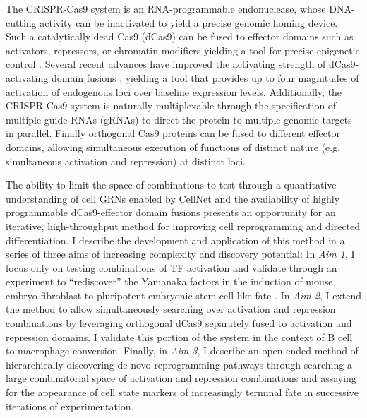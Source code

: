 \documentclass[10pt]{article}
\begin{document}
The CRISPR-Cas9 system is an RNA-programmable endonuclease, whose DNA-cutting activity can be inactivated to yield a precise genomic homing device. Such a catalytically dead Cas9 (dCas9) can be fused to effector domains such as activators, repressors, or chromatin modifiers yielding a tool for precise epigenetic control \cite{qi2013repurposing}. Several recent advances have improved the activating strength of dCas9-activating domain fusions \cite{konermann2014genome, chavez2015VPR}, yielding a tool that provides up to four magnitudes of activation of endogenous loci over baseline expression levels. Additionally, the CRISPR-Cas9 system is naturally multiplexable through the specification of multiple guide RNAs (gRNAs) to direct the protein to multiple genomic targets in parallel. Finally orthogonal Cas9 proteins \cite{esvelt2013orthogonal} can be fused to different effector domains, allowing simultaneous execution of functions of distinct nature (e.g. simultaneous activation and repression) at distinct loci.

The ability to limit the space of combinations to test through a quantitative understanding of cell GRNs enabled by CellNet and the availability of highly programmable dCas9-effector domain fusions presents an opportunity for an iterative, high-throughput method for improving cell reprogramming and directed differentiation. I describe the development and application of this method in a series of three aims of increasing complexity and discovery potential: In \textit{Aim 1}, I focus only on testing combinations of TF activation and validate through an experiment to ``rediscover'' the Yamanaka factors in the induction of mouse embryo fibroblast to pluripotent embryonic stem cell-like fate \cite{takahashi2006induction}. In \textit{Aim 2}, I extend the method to allow simultaneously searching over activation and repression combinations by leveraging orthogonal dCas9 \cite{esvelt2013orthogonal} separately fused to activation and repression domains. I validate this portion of the system in the context of B cell to macrophage conversion. Finally, in \textit{Aim 3}, I describe an open-ended method of hierarchically discovering de novo reprogramming pathways through searching a large combinatorial space of activation and repression combinations and assaying for the appearance of cell state markers of increasingly terminal fate in successive iterations of experimentation.

\end{document}

